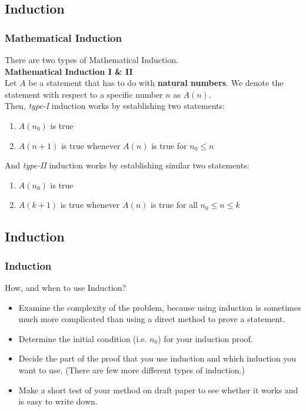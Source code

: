 \documentclass[12pt, t]{beamer}
\renewcommand{\emph}[1]{{\color{Turquoise3}\textsl{#1}}}
\begin{document}
\subsection{Induction}
\begin{frame}
    \frametitle{Mathematical Induction}
    There are two types of Mathematical Induction.\\
    \textbf{Mathematical Induction I \& II}\\
    \hspace{1em} Let $A$ be a statement that has to do with \textbf{natural numbers}. We denote
    the statement with respect to a specific number $n$ as $A(n)$. \\
    \vspace{1em}
    Then, \emph{type-I} induction works by establishing two statements:
    \begin{enumerate}
        \item $A(n_0)$ is true
        \item $A(n+1)$ is true whenever $A(n)$ is true for $n_0\leq n$
    \end{enumerate}
    \vspace{1em}
    And \emph{type-II} induction works by establishing similar two statements:
    \begin{enumerate}
        \item $A(n_0)$ is true
        \item $A(k+1)$ is true whenever $A(n)$ is true for all $n_0\leq n\leq k$
    \end{enumerate}
\end{frame}

\subsection{Induction}
\begin{frame}
    \frametitle{Induction}
    How, and when to use Induction?
    \begin{itemize}
        \item Examine the complexity of the problem, because using induction is sometimes much more
              complicated than using a direct method to prove a statement.
        \item Determine the initial condition (i.e. $n_0$) for your induction proof.
        \item Decide the part of the proof that you use induction and which induction you want to use.
              (There are few more different types of induction.)
        \item Make a short test of your method on draft paper to see whether it works and is easy to write down.
    \end{itemize}
\end{frame}
\end{document}
